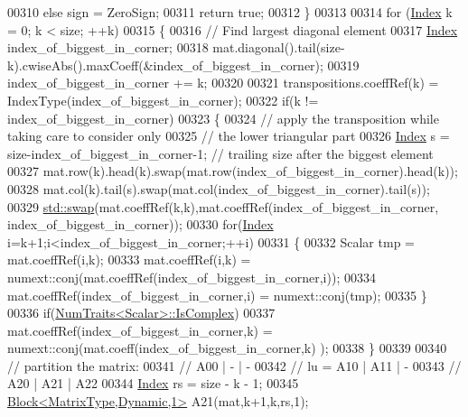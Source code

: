 \begin{DoxyCode}
00310       \textcolor{keywordflow}{else} sign = ZeroSign;
00311       \textcolor{keywordflow}{return} \textcolor{keyword}{true};
00312     \}
00313 
00314     \textcolor{keywordflow}{for} (\hyperlink{namespace_eigen_a62e77e0933482dafde8fe197d9a2cfde}{Index} k = 0; k < size; ++k)
00315     \{
00316       \textcolor{comment}{// Find largest diagonal element}
00317       \hyperlink{namespace_eigen_a62e77e0933482dafde8fe197d9a2cfde}{Index} index\_of\_biggest\_in\_corner;
00318       mat.diagonal().tail(size-k).cwiseAbs().maxCoeff(&index\_of\_biggest\_in\_corner);
00319       index\_of\_biggest\_in\_corner += k;
00320 
00321       transpositions.coeffRef(k) = IndexType(index\_of\_biggest\_in\_corner);
00322       \textcolor{keywordflow}{if}(k != index\_of\_biggest\_in\_corner)
00323       \{
00324         \textcolor{comment}{// apply the transposition while taking care to consider only}
00325         \textcolor{comment}{// the lower triangular part}
00326         \hyperlink{namespace_eigen_a62e77e0933482dafde8fe197d9a2cfde}{Index} s = size-index\_of\_biggest\_in\_corner-1; \textcolor{comment}{// trailing size after the biggest element}
00327         mat.row(k).head(k).swap(mat.row(index\_of\_biggest\_in\_corner).head(k));
00328         mat.col(k).tail(s).swap(mat.col(index\_of\_biggest\_in\_corner).tail(s));
00329         \hyperlink{endian_8c_a3ca5ecd34b04d6a243c054ac3a57f68d}{std::swap}(mat.coeffRef(k,k),mat.coeffRef(index\_of\_biggest\_in\_corner,
      index\_of\_biggest\_in\_corner));
00330         \textcolor{keywordflow}{for}(\hyperlink{namespace_eigen_a62e77e0933482dafde8fe197d9a2cfde}{Index} i=k+1;i<index\_of\_biggest\_in\_corner;++i)
00331         \{
00332           Scalar tmp = mat.coeffRef(i,k);
00333           mat.coeffRef(i,k) = numext::conj(mat.coeffRef(index\_of\_biggest\_in\_corner,i));
00334           mat.coeffRef(index\_of\_biggest\_in\_corner,i) = numext::conj(tmp);
00335         \}
00336         \textcolor{keywordflow}{if}(\hyperlink{group___core___module_struct_eigen_1_1_num_traits}{NumTraits<Scalar>::IsComplex})
00337           mat.coeffRef(index\_of\_biggest\_in\_corner,k) = numext::conj(mat.coeff(index\_of\_biggest\_in\_corner,k)
      );
00338       \}
00339 
00340       \textcolor{comment}{// partition the matrix:}
00341       \textcolor{comment}{//       A00 |  -  |  -}
00342       \textcolor{comment}{// lu  = A10 | A11 |  -}
00343       \textcolor{comment}{//       A20 | A21 | A22}
00344       \hyperlink{namespace_eigen_a62e77e0933482dafde8fe197d9a2cfde}{Index} rs = size - k - 1;
00345       \hyperlink{group___core___module_class_eigen_1_1_block}{Block<MatrixType,Dynamic,1>} A21(mat,k+1,k,rs,1);

\end{DoxyCode}
